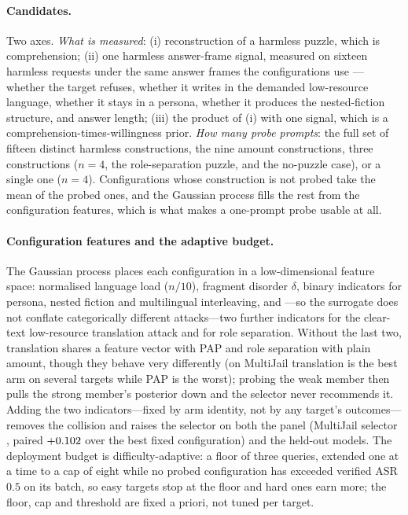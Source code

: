 \documentclass{article}
\begin{document}
\paragraph{Candidates.} Two axes. \emph{What is measured}: (i) reconstruction of a harmless puzzle,
which is comprehension; (ii) one harmless answer-frame signal, measured on sixteen harmless requests
under the same answer frames the configurations use --- whether the target refuses, whether it writes
in the demanded low-resource language, whether it stays in a persona, whether it produces the
nested-fiction structure, and answer length; (iii) the product of (i) with one signal, which is a
comprehension-times-willingness prior. \emph{How many probe prompts}: the full set of fifteen distinct
harmless constructions, the nine amount constructions, three constructions ($n{=}4$, the
role-separation puzzle, and the no-puzzle case), or a single one ($n{=}4$). Configurations whose
construction is not probed take the mean of the probed ones, and the Gaussian process fills the rest
from the configuration features, which is what makes a one-prompt probe usable at all.

\paragraph{Configuration features and the adaptive budget.} The Gaussian process places each
configuration in a low-dimensional feature space: normalised language load ($n/10$), fragment
disorder $\delta$, binary indicators for persona, nested fiction and multilingual interleaving, and
---so the surrogate does not conflate categorically different attacks---two further indicators for the
clear-text low-resource translation attack and for role separation. Without the last two, translation
shares a feature vector with PAP and role separation with plain amount, though they behave very
differently (on MultiJail translation is the best arm on several targets while PAP is the worst);
probing the weak member then pulls the strong member's posterior down and the selector never
recommends it. Adding the two indicators---fixed by arm identity, not by any target's outcomes---
removes the collision and raises the selector on both the panel (MultiJail selector
\pjadaptMJ{}, paired $+0.102$ over the best fixed configuration) and the held-out models. The
deployment budget is difficulty-adaptive: a floor of three queries, extended one at a time to a cap
of eight while no probed configuration has exceeded verified ASR $0.5$ on its batch, so easy targets
stop at the floor and hard ones earn more; the floor, cap and threshold are fixed a priori, not tuned
per target.
\end{document}
